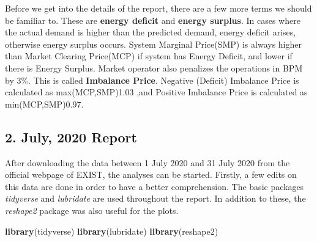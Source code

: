 \documentclass[
]{article}
\newenvironment{Shaded}{\begin{snugshade}}{\end{snugshade}}
\newcommand{\CharTok}[1]{\textcolor[rgb]{0.31,0.60,0.02}{#1}}
\newcommand{\DataTypeTok}[1]{\textcolor[rgb]{0.13,0.29,0.53}{#1}}
\newcommand{\KeywordTok}[1]{\textcolor[rgb]{0.13,0.29,0.53}{\textbf{#1}}}
\newcommand{\NormalTok}[1]{#1}
\newcommand{\OperatorTok}[1]{\textcolor[rgb]{0.81,0.36,0.00}{\textbf{#1}}}
\newcommand{\StringTok}[1]{\textcolor[rgb]{0.31,0.60,0.02}{#1}}
\begin{document}
Before we get into the details of the report, there are a few more terms
we should be familiar to. These are \textbf{energy deficit} and
\textbf{energy surplus}. In cases where the actual demand is higher than
the predicted demand, energy deficit arises, otherwise energy surplus
occurs. System Marginal Price(SMP) is always higher than Market Clearing
Price(MCP) if system has Energy Deficit, and lower if there is Energy
Surplus. Market operator also penalizes the operations in BPM by 3\%.
This is called \textbf{Imbalance Price}. Negative (Deficit) Imbalance
Price is calculated as max(MCP,SMP)1.03 ,and Positive Imbalance Price is
calculated as min(MCP,SMP)0.97.

\hypertarget{july-2020-report}{%
\subsection{2. July, 2020 Report}\label{july-2020-report}}

After downloading the data between 1 July 2020 and 31 July 2020 from the
official webpage of EXIST, the analyses can be started. Firstly, a few
edits on this data are done in order to have a better comprehension. The
basic packages \emph{tidyverse} and \emph{lubridate} are used throughout
the report. In addition to these, the \emph{reshape2} package was also
useful for the plots.

\begin{Shaded}
\begin{Highlighting}[]
\KeywordTok{library}\NormalTok{(tidyverse) }
\KeywordTok{library}\NormalTok{(lubridate)}
\KeywordTok{library}\NormalTok{(reshape2)}
\end{Highlighting}
\end{Shaded}

\begin{Shaded}
\end{Shaded}
\end{document}
